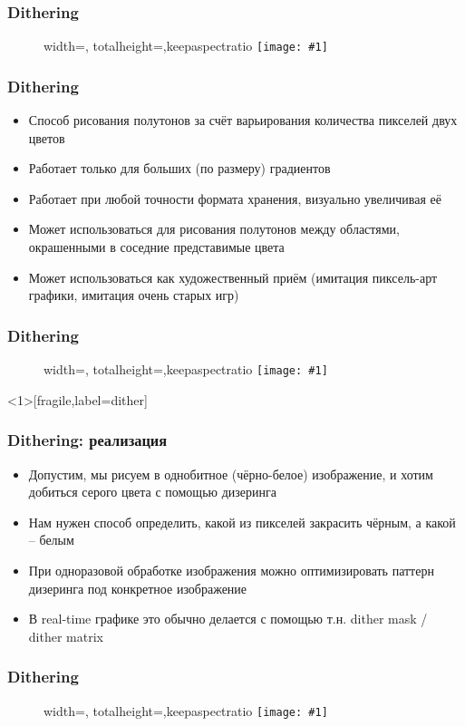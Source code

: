 \documentclass[10pt]{beamer}
\newcommand{\slideimage}[1]{
  \begin{figure}
    \begin{adjustbox}{width=\textwidth, totalheight=\textheight-2\baselineskip-2\baselineskip,keepaspectratio}
      \texttt{[image: \#1]}
    \end{adjustbox}
  \end{figure}
}
\begin{document}
\begin{frame}[fragile]
\frametitle{Dithering}
\slideimage{dither.png}
\end{frame}

\begin{frame}[fragile]
\frametitle{Dithering}
\begin{itemize}
\item Способ рисования полутонов за счёт варьирования количества пикселей двух цветов
\pause
\item Работает только для больших (по размеру) градиентов
\pause
\item Работает при любой точности формата хранения, визуально увеличивая её
\pause
\item Может использоваться для рисования полутонов между областями, окрашенными в соседние представимые цвета
\pause
\item Может использоваться как художественный приём (имитация пиксель-арт графики, имитация очень старых игр)
\end{itemize}
\end{frame}

\begin{frame}[fragile]
\frametitle{Dithering}
\slideimage{dither2.png}
\end{frame}

\begin{frame}<1>[fragile,label=dither]
\frametitle{Dithering: реализация}
\begin{itemize}
\item Допустим, мы рисуем в однобитное (чёрно-белое) изображение, и хотим добиться серого цвета с помощью дизеринга
\pause
\item Нам нужен способ определить, какой из пикселей закрасить чёрным, а какой -- белым
\pause
\item При одноразовой обработке изображения можно оптимизировать паттерн дизеринга под конкретное изображение
\pause
\item В real-time графике это обычно делается с помощью т.н. dither mask / dither matrix
\end{itemize}
\end{frame}

\begin{frame}[fragile]
\frametitle{Dithering}
\slideimage{dither3.png}
\end{frame}

\end{document}
